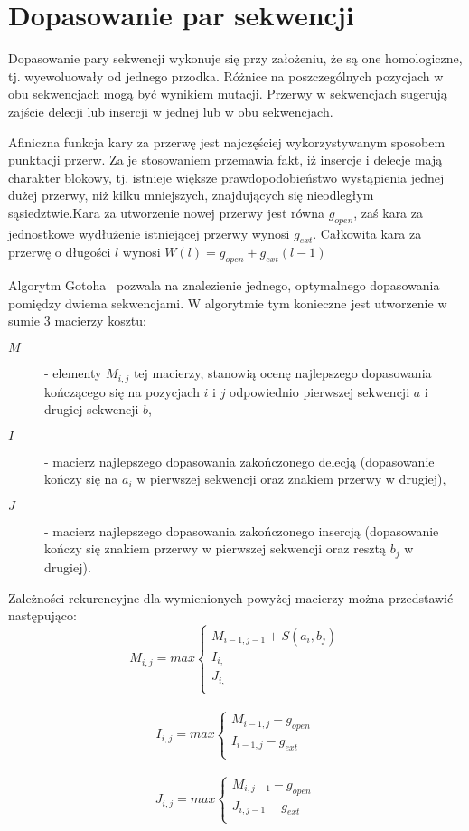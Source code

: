 \documentclass[a4paper,10pt]{article}
\begin{document}
	\section{Dopasowanie par sekwencji}

	Dopasowanie pary sekwencji wykonuje się przy założeniu, że są one homologiczne, tj. wyewoluowały od jednego przodka. Różnice na poszczególnych pozycjach w obu sekwencjach mogą być wynikiem mutacji. Przerwy w sekwencjach sugerują zajście delecji lub insercji w jednej lub w obu sekwencjach.

	Afiniczna funkcja kary za przerwę jest najczęściej wykorzystywanym sposobem punktacji przerw. Za je stosowaniem przemawia fakt, iż insercje i delecje mają charakter blokowy, tj. istnieje większe prawdopodobieństwo wystąpienia jednej dużej przerwy, niż kilku mniejszych, znajdujących się nieodległym sąsiedztwie.Kara za utworzenie nowej przerwy jest równa $g_{open}$, zaś kara za jednostkowe wydłużenie istniejącej przerwy wynosi $g_{ext}$. Całkowita kara za przerwę o długości $l$ wynosi \mbox{$W(l) = g_{open} + g_{ext}(l - 1)$}

	Algorytm Gotoha~\cite{gotoh} pozwala na znalezienie jednego, optymalnego dopasowania  pomiędzy dwiema sekwencjami. W algorytmie tym konieczne jest utworzenie w sumie 3 macierzy kosztu:
	\begin{description}
	\item[$M$]
	 - elementy $M_{i,j}$ tej macierzy, stanowią ocenę najlepszego dopasowania kończącego się na pozycjach $i$ i $j$ odpowiednio pierwszej sekwencji $a$ i drugiej sekwencji $b$,
	\item[$I$]
	 - macierz najlepszego dopasowania zakończonego delecją (dopasowanie kończy się na $a_i$ w pierwszej sekwencji oraz znakiem przerwy w drugiej),
	\item[$J$]
	 - macierz najlepszego dopasowania zakończonego insercją (dopasowanie kończy się znakiem przerwy w pierwszej sekwencji oraz resztą $b_j$ w drugiej).
	\end{description}
	Zależności rekurencyjne dla wymienionych powyżej macierzy można przedstawić następująco:
	\[
		M_{i,j} = max \left\{
			\begin{array}{ll}
				M_{i-1, j-1} + S(a_i, b_j)\\
				I_{i, }\\
				J_{i, }\\
			\end{array} \right.
	\]\\
	\[
		I_{i,j} = max \left\{
			\begin{array}{ll}
				M_{i-1, j} - g_{open}\\
				I_{i-1, j} - g_{ext}\\
			\end{array} \right.
	\]\\
	\[
		J_{i,j} = max \left\{
			\begin{array}{ll}
				M_{i, j-1} - g_{open}\\
				J_{i, j-1} - g_{ext}\\
			\end{array} \right.
	\]
\end{document}
